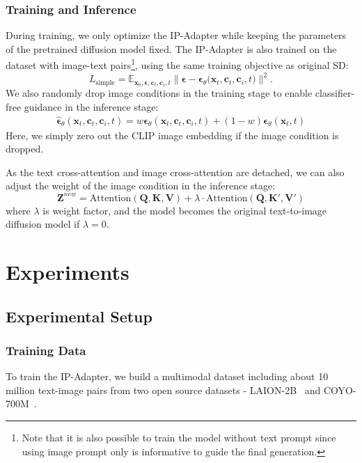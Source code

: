 \documentclass{article}
\begin{document}
\subsubsection{Training and Inference}
During training, we only optimize the IP-Adapter while keeping the parameters of the pretrained diffusion model fixed. The IP-Adapter is also trained on the dataset with image-text pairs\footnote{Note that it is also possible to train the model without text prompt since using image prompt only is informative to guide the final generation.}, using the same training objective as original SD:
\begin{equation}
L_{\text{simple}}=\mathbb{E}_{\boldsymbol{x}_{0},\boldsymbol{\epsilon}, \boldsymbol{c}_{t}, \boldsymbol{c}_{i}, t} \| \boldsymbol{\epsilon}- \boldsymbol{\epsilon}_\theta\big(\boldsymbol{x}_t, \boldsymbol{c}_{t}, \boldsymbol{c}_{i}, t\big)\|^2.
\end{equation}
We also randomly drop image conditions in the training stage to enable classifier-free guidance in the inference stage:
\begin{equation}
\begin{split}
\hat{\boldsymbol{\epsilon}}_{\theta}(\boldsymbol{x}_t, \boldsymbol{c}_{t}, \boldsymbol{c}_{i}, t) = w\boldsymbol{\epsilon}_{\theta}(\boldsymbol{x}_t, \boldsymbol{c}_{t}, \boldsymbol{c}_{i}, t)+(1-w)\boldsymbol{\epsilon}_{\theta}(\boldsymbol{x}_t, t)
\end{split}
\end{equation}
Here, we simply zero out the CLIP image embedding if the image condition is dropped. 

As the text cross-attention and image cross-attention are detached, we can also adjust the weight of the image condition in the inference stage:
\begin{equation}
\mathbf{Z}^{new}=\text{Attention}(\mathbf{Q},\mathbf{K},\mathbf{V}) + \lambda\cdot\text{Attention}(\mathbf{Q},\mathbf{K}',\mathbf{V}')
\end{equation}
where $\lambda$ is weight factor, and the model becomes the original text-to-image diffusion model if $\lambda=0$. 

\section{Experiments}
\subsection{Experimental Setup}
\subsubsection{Training Data}
To train the IP-Adapter, we build a multimodal dataset including  about 10 million text-image
pairs from two open source datasets - LAION-2B~\cite{schuhmann2022laion} and COYO-700M~\cite{kakaobrain2022coyo-700m}.
\end{document}
